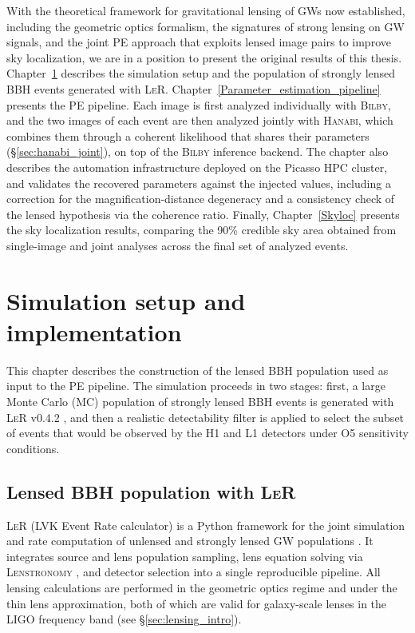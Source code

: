 \vspace{4cm}
With the theoretical framework for gravitational lensing 
of GWs now established, including the geometric optics 
formalism, the signatures of strong lensing on GW signals, 
and the joint PE approach that exploits lensed image pairs to improve sky localization, we are in a position to present the original results of this thesis. Chapter~\ref{ch:simulation} describes the simulation setup and the population of strongly lensed BBH events generated with \textsc{LeR}. Chapter~\ref{Parameter_estimation_pipeline} presents the PE pipeline. Each image is first analyzed individually with \textsc{Bilby}, and the two images of each event are then analyzed jointly with \textsc{Hanabi}, which combines them through a coherent likelihood that shares their parameters (\S\ref{sec:hanabi_joint}), on top of the \textsc{Bilby} inference backend. The chapter also describes the automation infrastructure deployed on the Picasso HPC cluster, and validates the recovered parameters against the injected values, including a correction for the magnification-distance degeneracy and a consistency check of the lensed hypothesis via the coherence ratio. Finally, Chapter~\ref{Skyloc} presents the sky localization results, comparing the 90\% credible sky area obtained from single-image and joint analyses across the final set of analyzed events.


\newpage


\chapter{Simulation setup and implementation}
\label{ch:simulation}

This chapter describes the construction of the lensed 
BBH population used as input to the PE pipeline. The simulation proceeds in two stages: first, a large Monte Carlo (MC) population of strongly lensed BBH events is generated with \textsc{LeR} v0.4.2 
\cite{phurailatpam2026lerlvkligovirgokagracollaboration}, and then a realistic detectability filter is applied to select the subset of events that would be observed by the H1 and L1 detectors under O5 sensitivity conditions.

\section{Lensed BBH population with \textsc{LeR}}
\label{sec:LER_population}

\textsc{LeR} (LVK Event Rate calculator) is a 
Python framework for the joint simulation and rate 
computation of unlensed and strongly lensed GW 
populations \cite{phurailatpam2026lerlvkligovirgokagracollaboration}. It integrates source and lens population sampling, lens equation solving via \textsc{Lenstronomy} \cite{lenstronomy}, and detector selection into a single reproducible pipeline. All lensing calculations are performed in the geometric optics regime and under the thin lens approximation, both of which are valid for galaxy-scale lenses in the LIGO frequency band (see \S\ref{sec:lensing_intro}).

